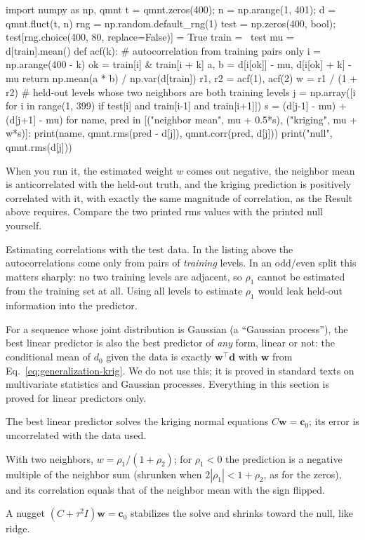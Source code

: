 \begin{pycode}
import numpy as np, qmnt
t = qmnt.zeros(400); n = np.arange(1, 401); d = qmnt.fluct(t, n)
rng = np.random.default_rng(1)
test = np.zeros(400, bool); test[rng.choice(400, 80, replace=False)] = True
train = ~test
mu = d[train].mean()
def acf(k):                         # autocorrelation from training pairs only
    i = np.arange(400 - k)
    ok = train[i] & train[i + k]
    a, b = d[i[ok]] - mu, d[i[ok] + k] - mu
    return np.mean(a * b) / np.var(d[train])
r1, r2 = acf(1), acf(2)
w = r1 / (1 + r2)
# held-out levels whose two neighbors are both training levels
j = np.array([i for i in range(1, 399) if test[i] and train[i-1] and train[i+1]])
s = (d[j-1] - mu) + (d[j+1] - mu)
for name, pred in [("neighbor mean", mu + 0.5*s), ("kriging", mu + w*s)]:
    print(name, qmnt.rms(pred - d[j]), qmnt.corr(pred, d[j]))
print("null", qmnt.rms(d[j]))
\end{pycode}

When you run it, the estimated weight $w$ comes out negative, the neighbor mean is anticorrelated with the held-out truth, and the kriging prediction is positively correlated with it, with exactly the same magnitude of correlation, as the Result above requires. Compare the two printed rms values with the printed null yourself.

\begin{pitfall}
Estimating correlations with the test data. In the listing above the autocorrelations come only from pairs of \emph{training} levels. In an odd/even split this matters sharply: no two training levels are adjacent, so $\rho_1$ cannot be estimated from the training set at all. Using all levels to estimate $\rho_1$ would leak held-out information into the predictor.
\end{pitfall}

\begin{beyond}
For a sequence whose joint distribution is Gaussian (a ``Gaussian process''), the best linear predictor is also the best predictor of \emph{any} form, linear or not: the conditional mean of $d_0$ given the data is exactly $\bm w^\top\bm d$ with $\bm w$ from Eq.~\eqref{eq:generalization-krig}. We do not use this; it is proved in standard texts on multivariate statistics and Gaussian processes. Everything in this section is proved for linear predictors only.
\end{beyond}

\begin{keyideas}
\item The best linear predictor solves the kriging normal equations $C\bm w=\bm c_0$; its error is uncorrelated with the data used.
\item With two neighbors, $w=\rho_1/(1+\rho_2)$; for $\rho_1<0$ the prediction is a negative multiple of the neighbor sum (shrunken when $2|\rho_1|<1+\rho_2$, as for the zeros), and its correlation equals that of the neighbor mean with the sign flipped.
\item A nugget $(C+\tau^2I)\bm w=\bm c_0$ stabilizes the solve and shrinks toward the null, like ridge.
\end{keyideas}

